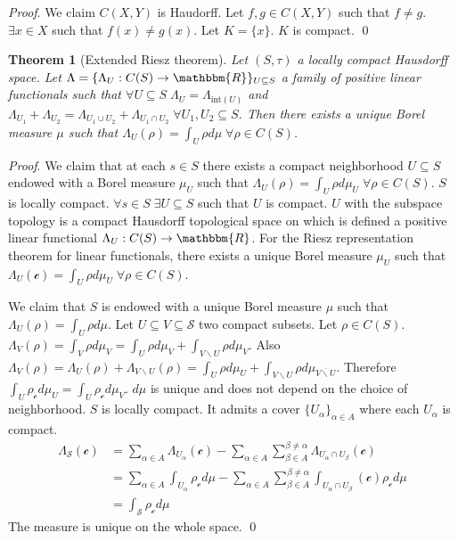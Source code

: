 \documentclass[aps,pra,10pt,twocolumn,floatfix,nofootinbib]{revtex4-1}
\numberwithin{equation}{section}
\newtheorem{thrm}[equation]{Theorem}
\theoremstyle{definition}
\renewenvironment{proof}{\emph{Proof}.}{\qed}
\begin{document}
\begin{proof}
	We claim $C(X, Y)$ is Haudorff. Let $f, g \in C(X, Y)$ such that $f \neq g$. $\exists x \in X$ such that $f(x)\neq g(x)$. Let $K = \{x\}$. $K$ is compact.
\end{proof}

\begin{thrm}[Extended Riesz theorem]\label{extended_riesz_theorem}
	Let $(S, \tau)$ a locally compact Hausdorff space. Let $\Lambda = \{\Lambda_U : C(S) \rightarrow \mathbbm{R}\}_{U \subseteq S}$ a family of positive linear functionals such that $\forall U \subseteq S \; \Lambda_U = \Lambda_{\mathrm{int}(U)}$ and $\Lambda_{U_1} + \Lambda_{U_2} = \Lambda_{U_1 \cup U_2} + \Lambda_{U_1 \cap U_2} \; \forall U_1, U_2 \subseteq S$. Then there exists a unique Borel measure $\mu$ such that $\Lambda_U (\rho) = \int_{U} \rho d\mu \; \forall \rho \in C(S)$.
\end{thrm}

\begin{proof}
	We claim that at each $s \in S$ there exists a compact neighborhood $U \subseteq S$ endowed with a Borel measure $\mu_U$ such that $\Lambda_U (\rho) = \int_U \rho d \mu_U \; \forall \rho \in C(S)$. $S$ is locally compact. $\forall s \in S \; \exists U \subseteq S$ such that $U$ is compact. $U$ with the subspace topology is a compact Hausdorff topological space on which is defined a positive linear functional $\Lambda_U : C(S) \rightarrow \mathbbm{R}$. For the Riesz representation theorem for linear functionals, there exists a unique Borel measure $\mu_U$ such that $\Lambda_U (\mathcal{c}) = \int_U \rho d \mu_U \; \forall \rho \in C(S)$.
	
	We claim that $S$ is endowed with a unique Borel measure $\mu$ such that $\Lambda_U (\rho) = \int_U \rho d \mu$. Let $U \subseteq V \subseteq \mathcal{S}$ two compact subsets. Let $\rho \in C(S)$. $\Lambda_V (\rho) = \int_V \rho d \mu_V = \int_U \rho d \mu_V + \int_{V\backslash U} \rho d \mu_V$. Also $\Lambda_V (\rho) = \Lambda_U (\rho) + \Lambda_{V\backslash U} (\rho) = \int_U \rho d \mu_U + \int_{V \backslash U} \rho d \mu_{\overline{V \backslash U}} $. Therefore $\int_{U} \rho_{\mathcal{c}} d \mu_U = \int_{U} \rho_{\mathcal{c}} d \mu_V$. $d\mu$ is unique and does not depend on the choice of neighborhood. $S$ is locally compact. It admits a cover $\{U_\alpha\}_{\alpha \in A}$ where each $U_\alpha$ is compact.
	\begin{align*}
	\Lambda_{\mathcal{S}}(\mathcal{c}) &= \sum \limits_{\alpha \in A} \Lambda_{U_\alpha}(\mathcal{c}) - \sum \limits_{\alpha \in A} \sum \limits_{\beta \in A}^{\beta \neq\alpha} \Lambda_{U_\alpha \cap U_\beta}(\mathcal{c}) \\
	&= \sum \limits_{\alpha \in A} \int_{U_\alpha} \rho_{\mathcal{c}} d\mu - \sum \limits_{\alpha \in A} \sum \limits_{\beta \in A}^{\beta \neq\alpha} \int_{U_\alpha \cap U_\beta}(\mathcal{c}) \rho_{\mathcal{c}} d\mu \\
	&= \int_{\mathcal{S}} \rho_{\mathcal{c}} d\mu
	\end{align*}
	The measure is unique on the whole space.
\end{proof}
\end{document}
